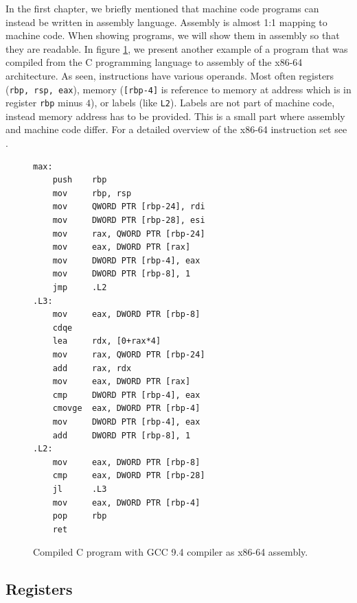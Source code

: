 In the first chapter, we briefly mentioned that machine code programs can
instead be written in assembly language. Assembly is almost 1:1 mapping to
machine code. When showing programs, we will show them in assembly so that they
are readable. In figure \ref{fig:assembly-example2}, we present another example
of a program that was compiled from the C programming language to assembly of
the x86-64 architecture. As seen, instructions have various operands. Most
often registers (\texttt{rbp, rsp, eax}), memory (\texttt{[rbp-4]} is reference
to memory at address which is in register \texttt{rbp} minus $4$), or labels
(like \texttt{L2}). Labels are not part of machine code, instead memory address
has to be provided. This is a small part where assembly and machine code
differ. For a detailed overview of the x86-64 instruction set see
\cite{intel-manual}.

\begin{figure}
    \begin{lstlisting}
max:
    push    rbp
    mov     rbp, rsp
    mov     QWORD PTR [rbp-24], rdi
    mov     DWORD PTR [rbp-28], esi
    mov     rax, QWORD PTR [rbp-24]
    mov     eax, DWORD PTR [rax]
    mov     DWORD PTR [rbp-4], eax
    mov     DWORD PTR [rbp-8], 1
    jmp     .L2
.L3:
    mov     eax, DWORD PTR [rbp-8]
    cdqe
    lea     rdx, [0+rax*4]
    mov     rax, QWORD PTR [rbp-24]
    add     rax, rdx
    mov     eax, DWORD PTR [rax]
    cmp     DWORD PTR [rbp-4], eax
    cmovge  eax, DWORD PTR [rbp-4]
    mov     DWORD PTR [rbp-4], eax
    add     DWORD PTR [rbp-8], 1
.L2:
    mov     eax, DWORD PTR [rbp-8]
    cmp     eax, DWORD PTR [rbp-28]
    jl      .L3
    mov     eax, DWORD PTR [rbp-4]
    pop     rbp
    ret
    \end{lstlisting}
    \caption{Compiled C program with GCC 9.4 compiler as x86-64 assembly.}
    \label{fig:assembly-example2}
\end{figure}

\subsection{Registers}\label{subsection:registers}

